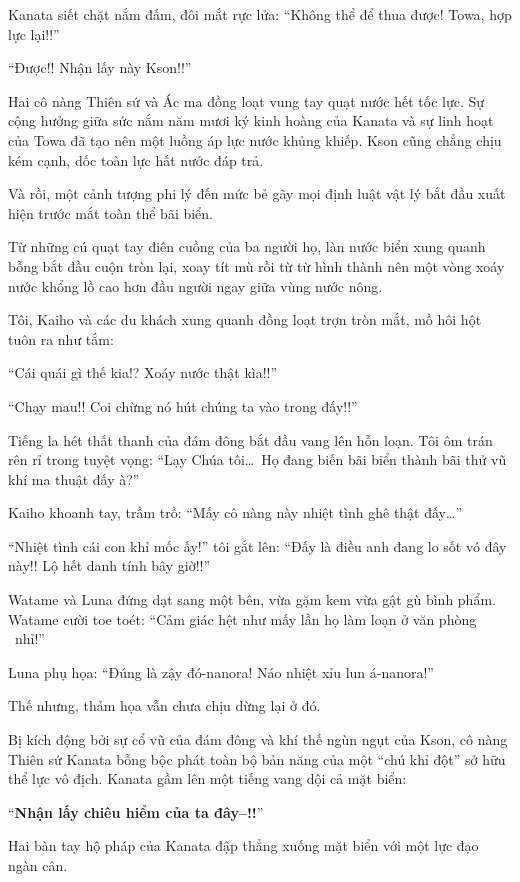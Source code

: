 \documentclass[../main.tex]{subfiles}
\begin{document}
Kanata siết chặt nắm đấm, đôi mắt rực lửa: ``Không thể để thua được! Towa, hợp lực lại!!''

``Được!! Nhận lấy này Kson!!''

Hai cô nàng Thiên sứ và Ác ma đồng loạt vung tay quạt nước hết tốc lực. Sự cộng hưởng giữa sức nắm năm mươi ký kinh hoàng của Kanata và sự linh hoạt của Towa đã tạo nên một luồng áp lực nước khủng khiếp. Kson cũng chẳng chịu kém cạnh, dốc toàn lực hất nước đáp trả.

Và rồi, một cảnh tượng phi lý đến mức bẻ gãy mọi định luật vật lý bắt đầu xuất hiện trước mắt toàn thể bãi biển.

Từ những cú quạt tay điên cuồng của ba người họ, làn nước biển xung quanh bỗng bắt đầu cuộn tròn lại, xoay tít mù rồi từ từ hình thành nên một vòng xoáy nước khổng lồ cao hơn đầu người ngay giữa vùng nước nông.

Tôi, Kaiho và các du khách xung quanh đồng loạt trợn tròn mắt, mồ hôi hột tuôn ra như tắm:

``Cái quái gì thế kia!? Xoáy nước thật kìa!!''

``Chạy mau!! Coi chừng nó hút chúng ta vào trong đấy!!''

Tiếng la hét thất thanh của đám đông bắt đầu vang lên hỗn loạn. Tôi ôm trán rên rỉ trong tuyệt vọng: ``Lạy Chúa tôi\dots\ Họ đang biến bãi biển thành bãi thử vũ khí ma thuật đấy à?''

Kaiho khoanh tay, trầm trồ: ``Mấy cô nàng này nhiệt tình ghê thật đấy\dots''

``Nhiệt tình cái con khỉ mốc ấy!'' tôi gắt lên: ``Đấy là điều anh đang lo sốt vó đây này!! Lộ hết danh tính bây giờ!!''

Watame và Luna đứng dạt sang một bên, vừa gặm kem vừa gật gù bình phẩm. Watame cười toe toét: ``Cảm giác hệt như mấy lần họ làm loạn ở văn phòng \hll\ nhỉ!''

Luna phụ họa: ``Đúng là zậy đó-nanora! Náo nhiệt xỉu lun á-nanora!''

Thế nhưng, thảm họa vẫn chưa chịu dừng lại ở đó.

Bị kích động bởi sự cổ vũ của đám đông và khí thế ngùn ngụt của Kson, cô nàng Thiên sứ Kanata bỗng bộc phát toàn bộ bản năng của một ``chú khỉ đột'' sở hữu thể lực vô địch. Kanata gầm lên một tiếng vang dội cả mặt biển:

``\textbf{Nhận lấy chiêu hiểm của ta đây--!!}''

Hai bàn tay hộ pháp của Kanata đập thẳng xuống mặt biển với một lực đạo ngàn cân.
\end{document}
